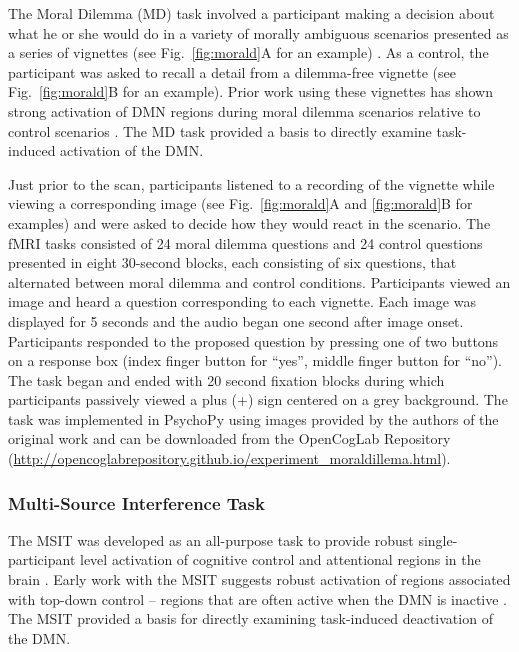 The Moral Dilemma (MD) task involved a participant making a decision about what he or she would do in a variety of morally ambiguous scenarios presented as a series of vignettes (see Fig.~\ref{fig:morald}A for an example) \cite{Harrison2008}. As a control, the participant was asked to recall a detail from a dilemma-free vignette (see Fig.~\ref{fig:morald}B for an example). Prior work using these vignettes has shown strong activation of DMN regions during moral dilemma scenarios relative to control scenarios \cite{Harrison2008}. The MD task provided a basis to directly examine task-induced activation of the DMN.

Just prior to the scan, participants listened to a recording of the vignette while viewing a corresponding image (see Fig.~\ref{fig:morald}A and \ref{fig:morald}B for examples) and were asked to decide how they would react in the scenario. The fMRI tasks consisted of 24 moral dilemma questions and 24 control questions presented in eight 30-second blocks, each consisting of six questions, that alternated between moral dilemma and control conditions. Participants viewed an image and heard a question corresponding to each vignette. Each image was displayed for 5 seconds and the audio began one second after image onset. Participants responded to the proposed question by pressing one of two buttons on a response box (index finger button for “yes”, middle finger button for “no”). The task began and ended with 20 second fixation blocks during which participants passively viewed a plus (+) sign centered on a grey background. The task was implemented in PsychoPy \cite{Peirce2008} using images provided by the authors of the original work \cite{Harrison2008} and can be downloaded from the OpenCogLab Repository (\url{http://opencoglabrepository.github.io/experiment\_moraldillema.html}).

\subsubsection{Multi-Source Interference Task}
The MSIT was developed as an all-purpose task to provide robust single-participant level activation of cognitive control and attentional regions in the brain \cite{Bush2006}. Early work with the MSIT suggests robust activation of regions associated with top-down control – regions that are often active when the DMN is inactive \cite{Bush2006}. The MSIT provided a basis for directly examining task-induced deactivation of the DMN.

